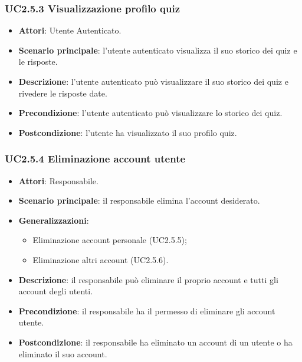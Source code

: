 \subsubsection{UC2.5.3 Visualizzazione profilo quiz}
\begin{itemize}
\item \textbf{Attori}: Utente Autenticato.
\item \textbf{Scenario principale}: l'utente autenticato visualizza il suo storico dei quiz e le risposte.
\item \textbf{Descrizione}: l'utente autenticato può visualizzare il suo storico dei quiz e rivedere le risposte date.
\item \textbf{Precondizione}: l'utente autenticato può visualizzare lo storico dei quiz.
\item \textbf{Postcondizione}: l'utente ha visualizzato il suo profilo quiz.
\end{itemize}
\subsubsection{UC2.5.4 Eliminazione account utente}
\begin{itemize}
\item \textbf{Attori}: Responsabile.
\item \textbf{Scenario principale}: il responsabile elimina l'account desiderato.
\item \textbf{Generalizzazioni}:
\begin{itemize}
\item Eliminazione account personale (UC2.5.5);
\item Eliminazione altri account (UC2.5.6).
\end{itemize}
\item \textbf{Descrizione}: il responsabile può eliminare il proprio account e tutti gli account degli utenti.
\item \textbf{Precondizione}: il responsabile ha il permesso di eliminare gli account utente.
\item \textbf{Postcondizione}: il responsabile ha eliminato un account di un utente o ha eliminato il suo account.
\end{itemize}
